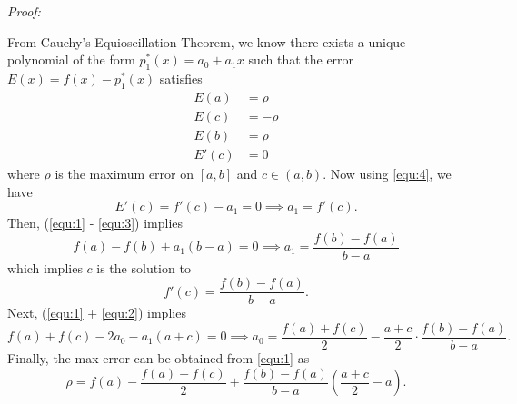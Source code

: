\documentclass[a4paper,12pt]{article}
\newenvironment{proof}[2][$\square$]
    {\setlength{\parskip}{0pt}\par\textit{Proof:} #2\setlength{\parskip}{0.25cm}
        \savebox{\qed}{#1}
        \begin{adjustwidth}{\widthof{Proof:}}{}
    }
    {
        \hfill\usebox{\qed}\end{adjustwidth}
    }
\begin{document}
\begin{enumerate}[label = \arabic*.]
	\begin{proof}{}
		From Cauchy's Equioscillation Theorem, we know there exists a unique polynomial of the form $ p_1^*(x) = a_0+ a_1 x $ such that the error $ E(x) = f(x) - p_1^*(x) $ satisfies
		\begin{align}
			E(a) &= \rho \label{equ:1} \\
			E(c) &= -\rho \label{equ:2} \\ 
			E(b) &= \rho \label{equ:3} \\
			E'(c) &= 0 \label{equ:4}
		\end{align}
		where $ \rho $ is the maximum error on $ [a, b] $ and $ c \in (a,b) $. Now using \eqref{equ:4}, we have
		\[
			E'(c) = f'(c) - a_1 = 0 \implies a_1 = f'(c).
		\]
		Then, (\eqref{equ:1} - \eqref{equ:3}) implies
		\[
			f(a) - f(b) + a_1(b - a) = 0 \implies \boxed{a_1 = \frac{f(b) - f(a)}{b - a}}
		\]
		which implies $ c $ is the solution to 
		\[
			\boxed{f'(c) = \frac{f(b) - f(a)}{b - a}}.
		\]
		Next, (\eqref{equ:1} + \eqref{equ:2}) implies
		\[
			f(a) + f(c) - 2a_0 - a_1 (a + c) = 0 \implies \boxed{a_0 = \frac{f(a) + f(c)}{2} - \frac{a + c}{2} \cdot \frac{f(b) - f(a)}{b - a}}.
		\]
		Finally, the max error can be obtained from \eqref{equ:1} as
		\[
			\boxed{\rho = f(a) - \frac{f(a) + f(c)}{2} + \frac{f(b) - f(a)}{b - a} \left(\frac{a + c}{2} -  a\right)}.
		\]
	\end{proof}
\end{enumerate}
\end{document}

